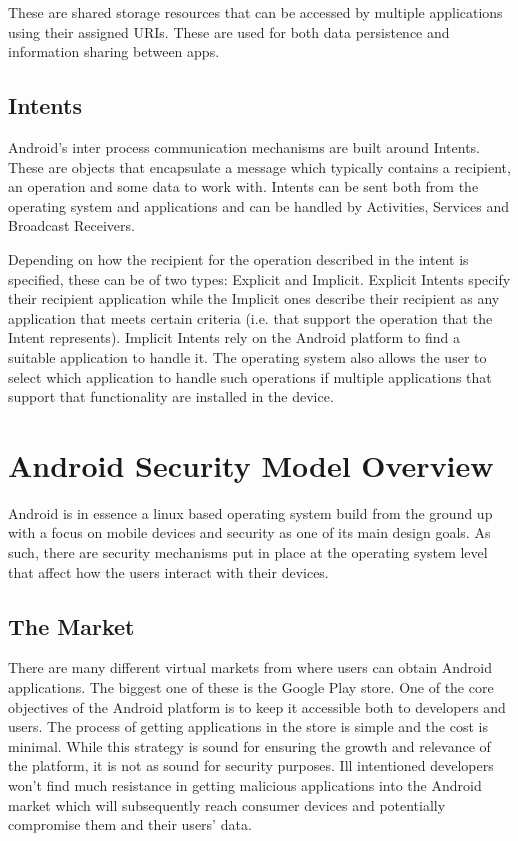 \documentclass{sig-alternate}
\begin{document}
These are shared storage resources that can be accessed by multiple applications using their assigned URIs. These are used for both data persistence and information sharing between apps.

\subsection{Intents}

Android's inter process communication mechanisms are built around Intents. These are objects that encapsulate a message which typically contains a recipient, an operation and some data to work with. Intents can be sent both from the operating system and applications and can be handled by Activities, Services and Broadcast Receivers.

Depending on how the recipient for the operation described in the intent is specified, these can be of two types: Explicit and Implicit. Explicit Intents specify their recipient application while the Implicit ones describe their recipient as any application that meets certain criteria (i.e. that support the operation that the Intent represents). Implicit Intents rely on the Android platform to find a suitable application to handle it. The operating system also allows the user to select which application to handle such operations if multiple applications that support that functionality are installed in the device.

\section{Android Security Model Overview}

Android is in essence a linux based operating system build from the ground up with a focus on mobile devices and security as one of its main design goals. As such, there are security mechanisms put in place at the operating system level that affect how the users interact with their devices.

\subsection{The Market}

There are many different virtual markets from where users can obtain Android applications. The biggest one of these is the Google Play store. One of the core objectives of the Android platform is to keep it accessible both to developers and users. The process of getting applications in the store is simple and the cost is minimal. While this strategy is sound for ensuring the growth and relevance of the platform, it is not as sound for security purposes. Ill intentioned developers won't find much resistance in getting malicious applications into the Android market which will subsequently reach consumer devices and potentially compromise them and their users' data.
\end{document}
